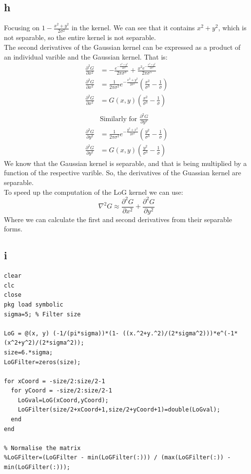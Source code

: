 \documentclass[11pt]{article}
\begin{document}
\subsection{h}
\label{sec:orgb7cba26}
Focusing on \(1-\frac{x^2+y^2}{2\sigma^2}\) in the kernel. We can see that it contains \(x^2+y^2\), which is not separable, so the entire kernel is not separable. \\
The second derivatives of the Gaussian kernel can be expressed as a product of an individual varible and the Gaussian kernel. That is:
\begin{align*}
\frac{\partial^2 G}{\partial x^2}&=-\frac{e^{-\frac{ x^{2} + y^2}{2 \sigma^{2}}}}{2 \pi \sigma^{3}} + \frac{x^{2} e^{-\frac{ x^{2} + y^2}{2 \sigma^{2}}}}{2 \pi \sigma^{5}} \\
\frac{\partial^2 G}{\partial x^2}&=\frac{1}{2\pi\sigma^2}e^{-\frac{x^2+y^2}{2\sigma^2}} \left( \frac{x^2}{\sigma^3}-\frac{1}{\sigma}\right) \\
\frac{\partial^2 G}{\partial x^2}&=G(x,y)\left( \frac{x^2}{\sigma^3}-\frac{1}{\sigma}\right) \\
& \\
& \textrm{Similarly for } \frac{\partial^2 G}{\partial y^2}\\
\frac{\partial^2 G}{\partial y^2}&=\frac{1}{2\pi\sigma^2}e^{-\frac{y^2+x^2}{2\sigma^2}} \left( \frac{y^2}{\sigma^3}-\frac{1}{\sigma}\right) \\
\frac{\partial^2 G}{\partial y^2}&=G(x,y)\left( \frac{y^2}{\sigma^3}-\frac{1}{\sigma}\right)
\end{align*}
We know that the Gaussian kernel is separable, and that is being multiplied by a function of the respective varible. So, the derivatives of the Guassian kernel are separable.\\
To speed up the computation of the LoG kernel we can use:
\[\nabla^2 G\approx \frac{\partial^2 G}{\partial x^2} + \frac{\partial^2 G}{\partial y^2}\]
Where we can calculate the first and second derivatives from their separable forms.
\subsection{i}
\label{sec:orga7ba25f}
\begin{verbatim}
clear
clc
close
pkg load symbolic
sigma=5; % Filter size

LoG = @(x, y) (-1/(pi*sigma))*(1- ((x.^2+y.^2)/(2*sigma^2)))*e^(-1*(x^2+y^2)/(2*sigma^2));
size=6.*sigma;
LoGFilter=zeros(size);

for xCoord = -size/2:size/2-1
  for yCoord = -size/2:size/2-1
    LoGval=LoG(xCoord,yCoord);
    LoGFilter(size/2+xCoord+1,size/2+yCoord+1)=double(LoGval);
  end
end

% Normalise the matrix
%LoGFilter=(LoGFilter - min(LoGFilter(:))) / (max(LoGFilter(:)) - min(LoGFilter(:)));

\end{verbatim}
\end{document}
